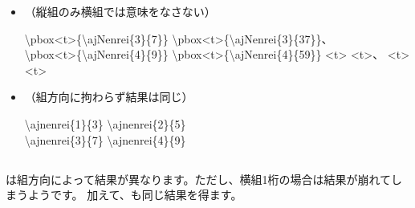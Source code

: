 \documentclass[uplatex, dvipdfmx, paper=a4paper, line_length=45zw, head_space=7zw, foot_space=10zw]{jlreq}
\begin{document}
\begin{itemize}
\begin{itemize}
\begin{demosource}[0.25]
          {\textbackslash}pbox<t>\{{\textbackslash}ajNenrei\{2\}\{25\}\}%
          \tcblower
          \ibmfamily
          \pbox<t>{}%
          \pbox<t>{}、%
          \pbox<t>{}%
          \pbox<t>{}%
        \end{demosource}
    \end{itemize}
  \item {}（縦組のみ横組では意味をなさない）
    \begin{demosource}[0.25]
      {\textbackslash}pbox<t>\{{\textbackslash}ajNenrei\{3\}\{7\}\}%
      {\textbackslash}pbox<t>\{{\textbackslash}ajNenrei\{3\}\{37\}\}、\\%
      {\textbackslash}pbox<t>\{{\textbackslash}ajNenrei\{4\}\{9\}\}%
      {\textbackslash}pbox<t>\{{\textbackslash}ajNenrei\{4\}\{59\}\}%
      \tcblower
      \ibmfamily
      \pbox<t>{}%
      \pbox<t>{}、%
      \pbox<t>{}%
      \pbox<t>{}%
    \end{demosource}
  \item {}（組方向に拘わらず結果は同じ）
    \begin{demosource}[0.25]
      {\textbackslash}ajnenrei\{1\}\{3\}%
      {\textbackslash}ajnenrei\{2\}\{5\}\\%
      {\textbackslash}ajnenrei\{3\}\{7\}%
      {\textbackslash}ajnenrei\{4\}\{9\}%
      \tcblower
      \ibmfamily
    \end{demosource}
\end{itemize}

\vfil
\subsection{\texorpdfstring{}{\textbackslash ajTsumekakko}}

は組方向によって結果が異なります。ただし、横組1桁の場合は結果が崩れてしまうようです。
加えて、も同じ結果を得ます。
\end{document}
